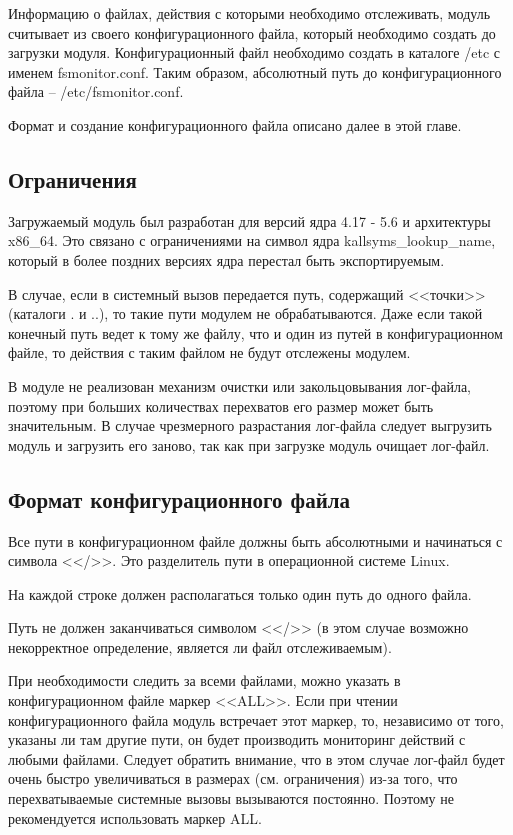 \documentclass[a4paper,14pt]{article}
\begin{document}
Информацию о файлах, действия с которыми необходимо отслеживать, модуль считывает из своего конфигурационного файла, который необходимо создать до загрузки модуля.  Конфигурационный файл необходимо создать в каталоге /etc с именем fsmonitor.conf. Таким образом, абсолютный путь до конфигурационного файла -- /etc/fsmonitor.conf.

Формат и создание конфигурационного файла описано далее в этой главе.

\subsection{Ограничения}

Загружаемый модуль был разработан для версий ядра 4.17 - 5.6 и архитектуры x86\_64. Это связано с ограничениями на символ ядра kallsyms\_lookup\_name, который в более поздних версиях ядра перестал быть экспортируемым.

В случае, если в системный вызов передается путь, содержащий <<точки>> (каталоги . и ..), то такие пути модулем не обрабатываются. Даже если такой конечный путь ведет к тому же файлу, что и один из путей в конфигурационном файле, то действия с таким файлом не будут отслежены модулем.

В модуле не реализован механизм очистки или закольцовывания лог-файла, поэтому при больших количествах перехватов его размер может быть значительным. В случае чрезмерного разрастания лог-файла следует выгрузить модуль и загрузить его заново, так как при загрузке модуль очищает лог-файл.

\subsection{Формат конфигурационного файла}

Все пути в конфигурационном файле должны быть абсолютными и начинаться с символа <</>>. Это разделитель пути в операционной системе Linux.

На каждой строке должен располагаться только один путь до одного файла.

Путь не должен заканчиваться символом <</>> (в этом случае возможно некорректное определение, является ли файл отслеживаемым).

При необходимости следить за всеми файлами, можно указать в конфигурационном файле маркер <<ALL>>. Если при чтении конфигурационного файла модуль встречает этот маркер, то, независимо от того, указаны ли там другие пути, он будет производить мониторинг действий с любыми файлами. Следует обратить внимание, что в этом случае лог-файл будет очень быстро увеличиваться в размерах (см. ограничения) из-за того, что перехватываемые системные вызовы вызываются постоянно. Поэтому не рекомендуется использовать маркер ALL.
\end{document}
